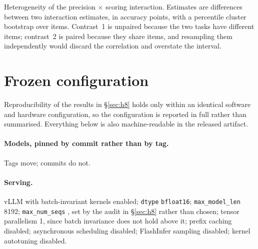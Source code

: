 \documentclass[11pt]{article}
\begin{document}
\begin{table}[t]
\centering
\small

\caption{Heterogeneity of the precision $\times$ scoring interaction. Estimates
are differences between two interaction estimates, in accuracy points, with a
percentile cluster bootstrap over items. Contrast~1 is unpaired because the two
tasks have different items; contrast~2 is paired because they share items, and
resampling them independently would discard the correlation and overstate the
interval.}
\label{tab:h3-heterogeneity}
\end{table}

\section{Frozen configuration}
\label{app:config}


Reproducibility of the results in \S\ref{sec:h8} holds only within an identical
software and hardware configuration, so the configuration is reported in full rather
than summarised. Everything below is also machine-readable in the released artifact.

\paragraph{Models, pinned by commit rather than by tag.}
Tags move; commits do not.

\begin{description}\itemsep0pt
  \item[Qwen2.5-3B-Instruct] {\small\texttt{}}
  \item[Phi-3.5-mini-instruct] {\small\texttt{}}
  \item[Llama-3.1-8B-Instruct] {\small\texttt{}}
\end{description}

\paragraph{Serving.} vLLM \hEightEngine{} with batch-invariant kernels enabled;
\texttt{dtype} \texttt{bfloat16}; \texttt{max\_model\_len} 8192;
\texttt{max\_num\_seqs} \hEightFrozenB{}, set by the audit in \S\ref{sec:h8} rather than
chosen; tensor parallelism 1, since batch invariance does not hold above it; prefix
caching disabled; asynchronous scheduling disabled; FlashInfer sampling disabled;
kernel autotuning disabled.
\end{document}
